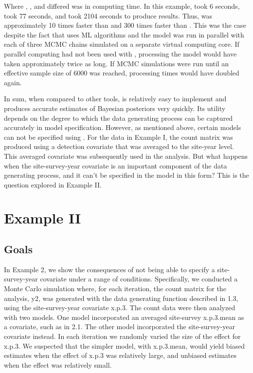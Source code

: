 \documentclass[article]{jss}
\begin{document}
Where , , and  differed was in computing time.  In this example,  took 6 seconds,  took 77 seconds, and  took 2104 seconds to produce results. Thus,  was approximately 10 times faster than  and 300 times faster than .  This was the case despite the fact that  uses ML algorithms and the  model was run in parallel with each of three MCMC chains simulated on a separate virtual computing core.  If parallel computing had not been used with , processing the  model would have taken approximately twice as long.  If MCMC simulations were run until an effective sample size of 6000 was reached, processing times would have doubled again.

In sum, when compared to other tools,  is relatively easy to implement and produces accurate estimates of Bayesian posteriors very quickly. Its utility depends on the degree to which the data generating process can be captured accurately in model specification.  However, as mentioned above, certain models can not be specified using .  For the data in Example I, the count matrix was produced using a detection covariate that was averaged to the site-year level.  This averaged covariate was subsequently used in the analysis. But what happens when the site-survey-year covariate is an important component of the data generating process, and it can't be specified in the model in this form?  This is the question explored in Example II.

\section[Example II]{Example II}
\subsection[Goals]{Goals}
In Example 2, we show the consequences of not being able to specify a site-survey-year covariate under a range of conditions.  Specifically, we conducted a Monte Carlo simulation where, for each iteration, the count matrix for the analysis, y2, was generated with the data generating function described in 1.3, using the site-survey-year covariate x.p.3.  The count data were then analyzed with two  models.  One model incorporated an averaged site-survey x.p.3.mean as a covariate, such as in 2.1.  The other model incorporated the site-survey-year covariate instead.  In each iteration we randomly varied the size of the effect for x.p.3.  We suspected that the simpler model, with x.p.3.mean, would yield biased estimates when the effect of x.p.3 was relatively large, and unbiased estimates when the effect was relatively small.
\end{document}
